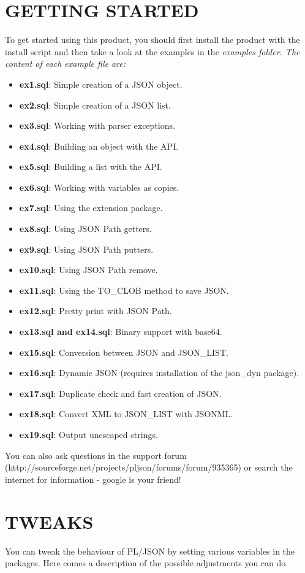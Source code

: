 \documentclass[11pt,a4paper]{article}
\begin{document}
\section{GETTING STARTED}
To get started using this product, you should first install the product with the install script and then take a look at the examples in the \em examples \em folder. The content of each example file are:
\begin{itemize}
\item \textbf{ex1.sql}: Simple creation of a JSON object. 
\item \textbf{ex2.sql}: Simple creation of a JSON list. 
\item \textbf{ex3.sql}: Working with parser exceptions.
\item \textbf{ex4.sql}: Building an object with the API.
\item \textbf{ex5.sql}: Building a list with the API.
\item \textbf{ex6.sql}: Working with variables as copies.
\item \textbf{ex7.sql}: Using the extension package.
\item \textbf{ex8.sql}: Using JSON Path getters.
\item \textbf{ex9.sql}: Using JSON Path putters.
\item \textbf{ex10.sql}: Using JSON Path remove.
\item \textbf{ex11.sql}: Using the TO\_CLOB method to save JSON.
\item \textbf{ex12.sql}: Pretty print with JSON Path.
\item \textbf{ex13.sql and ex14.sql}: Binary support with base64.
\item \textbf{ex15.sql}: Conversion between JSON and JSON\_LIST.
\item \textbf{ex16.sql}: Dynamic JSON (requires installation of the json\_dyn package).
\item \textbf{ex17.sql}: Duplicate check and fast creation of JSON.
\item \textbf{ex18.sql}: Convert XML to JSON\_LIST with JSONML.
\item \textbf{ex19.sql}: Output unescaped strings.
\end{itemize}
You can also ask questions in the support forum (http://sourceforge.net/projects/pljson/forums/forum/935365) or search the internet for information - google is your friend!

\section{TWEAKS}
You can tweak the behaviour of PL/JSON by setting various variables in the packages. Here comes a description of the possible adjustments you can do. 
\end{document}
